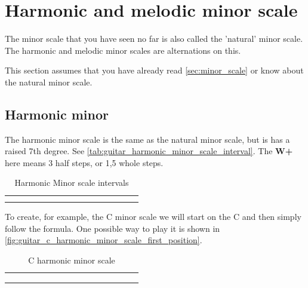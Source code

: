 \section{Harmonic and melodic minor scale}

The minor scale that you have seen no far is also called the 'natural' minor scale. The harmonic and melodic minor scales are alternations on this.

This section assumes that you have already read \autoref{sec:minor_scale} or know about the natural minor scale.

\subsection{Harmonic minor}

The harmonic minor scale is the same as the natural minor scale, but is has a raised 7th degree. See \autoref{tab:guitar_harmonic_minor_scale_interval}. The \textbf{W+} here means 3 half steps, or 1,5 whole steps.

\begin{table}[h]
	\centering
	\begin{NiceTabular}{*{16}{P{0.05mm}}}
		\Block{}{} &  & &  & &  & &  & &  & &  & &  & & \Block{}{} \\
		 & &  & &  & &  & &  & &  & &  & &  & 
	\end{NiceTabular}
	\caption{Harmonic Minor scale intervals}
	\label{tab:guitar_harmonic_minor_scale_interval}
\end{table}

To create, for example, the C minor scale we will start on the C and then simply follow the formula. One possible way to play it is shown in \autoref{fig:guitar_c_harmonic_minor_scale_first_position}.

\begin{table}[h]
	\centering
	\begin{NiceTabular}{*{16}{P{0.05mm}}}
		\Block{}{} &  & &  & &  & &  & &  & &  & &  & & \Block{}{} \\
		 & &  & &  & &  & &  & &  & &  & &  & \\
		 & &  & &  & &  & &  & &  & &  & &  & 
	\end{NiceTabular}
	\caption{C harmonic minor scale}
	\label{tab:guitar_c_harmonic_minor_scale}
\end{table}


